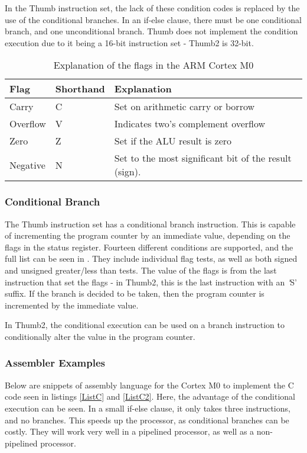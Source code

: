 \documentclass[12pt,a4paper]{article}
\begin{document}
\begin{bibunit}[is-unsrt]
In the Thumb instruction set, the lack of these condition codes is replaced by the use of the conditional branches.
In an if-else clause, there must be one conditional branch, and one unconditional branch.
Thumb does not implement the condition execution due to it being a 16-bit instruction set - Thumb2 is 32-bit.


\begin{table}
\centering
\begin{tabular}{p{}p{}p{}}\hline
Flag & Shorthand & Explanation \\ \hline
Carry & C & Set on arithmetic carry or borrow\\
Overflow & V & Indicates two's complement overflow\\
Zero & Z & Set if the ALU result is zero\\
Negative & N & Set to the most significant bit of the result (sign). \\
\end{tabular}
\caption{Explanation of the flags in the ARM Cortex M0}
\end{table}
\subsubsection{Conditional Branch}\label{arm:conditionalbranch}

The Thumb instruction set has a conditional branch instruction.
This is capable of incrementing the program counter by an immediate value, depending on the flags in the status register.
Fourteen different conditions are supported, and the full list can be seen in \cite{ARM:Thumb}.
They include individual flag tests, as well as both signed and unsigned greater/less than tests.
The value of the flags is from the last instruction that set the flags - in Thumb2, this is the last instruction with an {\textit 'S'} suffix.
If the branch is decided to be taken, then the program counter is incremented by the immediate value.

In Thumb2, the conditional execution can be used on a branch instruction to conditionally alter the value in the program counter.

\subsubsection{Assembler Examples}
Below are snippets of assembly language for the Cortex M0 to implement the C code seen in listings \ref{ListC} and \ref{ListC2}.
Here, the advantage of the conditional execution can be seen.
In a small if-else clause, it only takes three instructions, and no branches.
This speeds up the processor, as conditional branches can be costly.
They will work very well in a pipelined processor, as well as a non-pipelined processor.


\end{bibunit}
\end{document}
